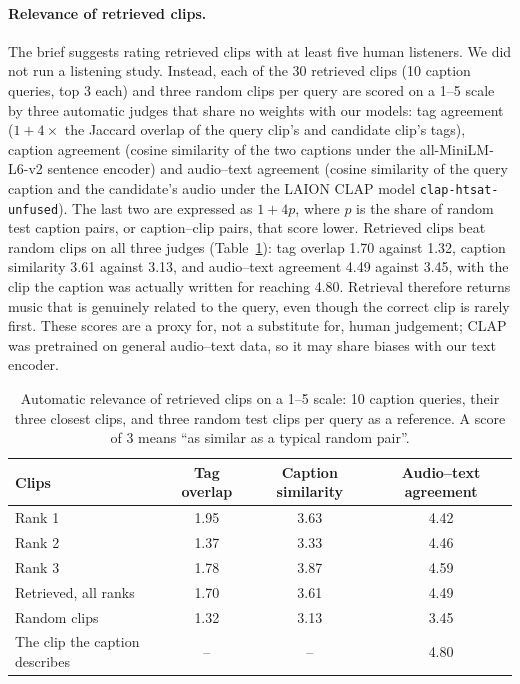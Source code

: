\documentclass{article}
\begin{document}
\paragraph{Relevance of retrieved clips.}
The brief suggests rating retrieved clips with at least five human listeners. We did not run a listening study.
Instead, each of the 30 retrieved clips (10 caption queries, top 3 each) and three random clips per query are scored
on a 1--5 scale by three automatic judges that share no weights with our models: tag agreement ($1 + 4\times$ the
Jaccard overlap of the query clip's and candidate clip's tags), caption agreement (cosine similarity of the two
captions under the all-MiniLM-L6-v2 sentence encoder) and audio--text agreement (cosine similarity of the query caption
and the candidate's audio under the LAION CLAP model \texttt{clap-htsat-unfused}). The last two are expressed as
$1 + 4p$, where $p$ is the share of random test caption pairs, or caption--clip pairs, that score lower. Retrieved clips
beat random clips on all three judges (Table~\ref{tab:relevance}): tag overlap 1.70 against 1.32, caption similarity
3.61 against 3.13, and audio--text agreement 4.49 against 3.45, with the clip the caption was actually written for
reaching 4.80. Retrieval therefore returns music that is genuinely related to the query, even though the correct clip
is rarely first. These scores are a proxy for, not a substitute for, human judgement; CLAP was pretrained on general
audio--text data, so it may share biases with our text encoder.

\begin{table}[t]
  \caption{Automatic relevance of retrieved clips on a 1--5 scale: 10 caption queries, their three closest clips, and
  three random test clips per query as a reference. A score of 3 means ``as similar as a typical random pair''.}
  \label{tab:relevance}
  \centering
  \small
  \begin{tabular}{lccc}
    \toprule
    Clips & Tag overlap & Caption similarity & Audio--text agreement \\
    \midrule
    Rank 1                & 1.95 & 3.63 & 4.42 \\
    Rank 2                & 1.37 & 3.33 & 4.46 \\
    Rank 3                & 1.78 & 3.87 & 4.59 \\
    Retrieved, all ranks  & 1.70 & 3.61 & 4.49 \\
    Random clips          & 1.32 & 3.13 & 3.45 \\
    The clip the caption describes & -- & -- & 4.80 \\
    \bottomrule
  \end{tabular}
\end{table}
\end{document}
